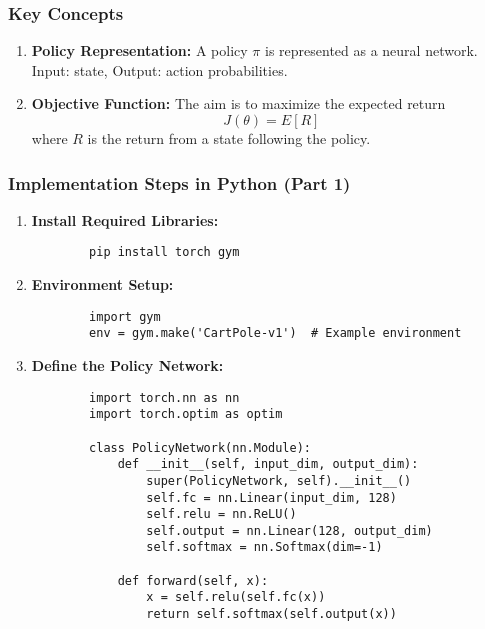 \documentclass[aspectratio=169]{beamer}
\begin{document}
\begin{frame}
    \frametitle{Key Concepts}
    \begin{enumerate}
        \item \textbf{Policy Representation:} 
        A policy $\pi$ is represented as a neural network. 
        Input: state, Output: action probabilities.
        \item \textbf{Objective Function:} 
        The aim is to maximize the expected return 
        \begin{equation}
            J(\theta) = E[R]
        \end{equation}
        where $R$ is the return from a state following the policy.
    \end{enumerate}
\end{frame}

\begin{frame}[fragile]
    \frametitle{Implementation Steps in Python (Part 1)}
    \begin{enumerate}
        \item \textbf{Install Required Libraries:}
        \begin{lstlisting}
        pip install torch gym
        \end{lstlisting}
        
        \item \textbf{Environment Setup:}
        \begin{lstlisting}
        import gym
        env = gym.make('CartPole-v1')  # Example environment
        \end{lstlisting}
        
        \item \textbf{Define the Policy Network:}
        \begin{lstlisting}
        import torch.nn as nn
        import torch.optim as optim

        class PolicyNetwork(nn.Module):
            def __init__(self, input_dim, output_dim):
                super(PolicyNetwork, self).__init__()
                self.fc = nn.Linear(input_dim, 128)
                self.relu = nn.ReLU()
                self.output = nn.Linear(128, output_dim)
                self.softmax = nn.Softmax(dim=-1)

            def forward(self, x):
                x = self.relu(self.fc(x))
                return self.softmax(self.output(x))
        \end{lstlisting}
    \end{enumerate}
\end{frame}
\end{document}

